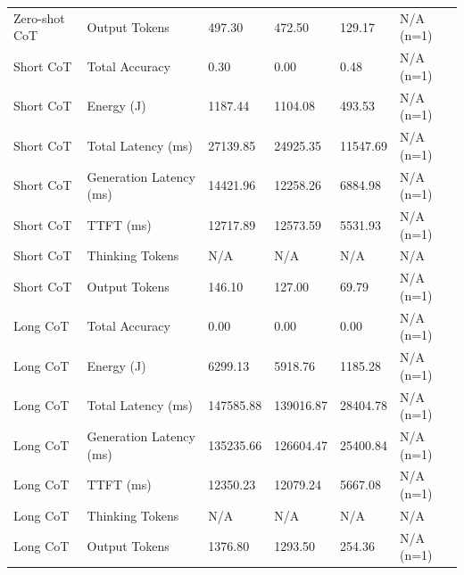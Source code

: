 \begin{table}
\begin{tabular}{llllll}
Zero-shot CoT & Output Tokens & 497.30 & 472.50 & 129.17 & N/A (n=1) \\
Short CoT & Total Accuracy & 0.30 & 0.00 & 0.48 & N/A (n=1) \\
Short CoT & Energy (J) & 1187.44 & 1104.08 & 493.53 & N/A (n=1) \\
Short CoT & Total Latency (ms) & 27139.85 & 24925.35 & 11547.69 & N/A (n=1) \\
Short CoT & Generation Latency (ms) & 14421.96 & 12258.26 & 6884.98 & N/A (n=1) \\
Short CoT & TTFT (ms) & 12717.89 & 12573.59 & 5531.93 & N/A (n=1) \\
Short CoT & Thinking Tokens & N/A & N/A & N/A & N/A \\
Short CoT & Output Tokens & 146.10 & 127.00 & 69.79 & N/A (n=1) \\
Long CoT & Total Accuracy & 0.00 & 0.00 & 0.00 & N/A (n=1) \\
Long CoT & Energy (J) & 6299.13 & 5918.76 & 1185.28 & N/A (n=1) \\
Long CoT & Total Latency (ms) & 147585.88 & 139016.87 & 28404.78 & N/A (n=1) \\
Long CoT & Generation Latency (ms) & 135235.66 & 126604.47 & 25400.84 & N/A (n=1) \\
Long CoT & TTFT (ms) & 12350.23 & 12079.24 & 5667.08 & N/A (n=1) \\
Long CoT & Thinking Tokens & N/A & N/A & N/A & N/A \\
Long CoT & Output Tokens & 1376.80 & 1293.50 & 254.36 & N/A (n=1) \\
\bottomrule
\end{tabular}
\end{table}
